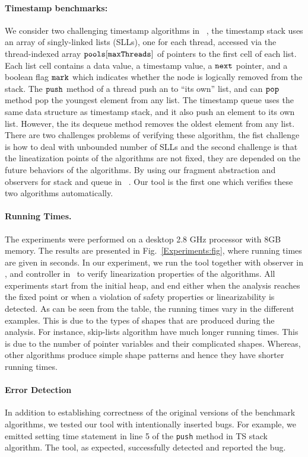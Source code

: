 \paragraph{Timestamp benchmarks:} We consider two challenging timestamp algorithms in ~\cite{ts-stack}, the timestamp stack uses an array of singly-linked lists (SLLs), one for each thread, accessed via the thread-indexed array ${\tt pools[maxThreads]}$ of pointers to the first cell of each list. Each list cell contains a data value, a timestamp value, a ${\tt next}$ pointer, and a boolean flag ${\tt mark}$ which indicates whether the node is logically removed from the stack. The $\tt push$ method of a thread push an to ``its own'' list, and can $\tt pop$ method pop the youngest element from any list. The timestamp queue uses the same data structure as timestamp stack, and it also push an element to its own list. However, the its dequeue method removes the oldest element from any list. There are two challenges problems of verifying these algorithm, the fist challenge is how to deal with unbounded number of SLLs and the second challenge is that the lineatization points of the algorithms are not fixed, they are depended on the future behaviors of the algorithms. By using our fragment abstraction and observers for stack and queue in ~\cite{BEEH:icalp15}. Our tool is the first one which verifies these two algorithms automatically.

\paragraph{Running Times.}The experiments were performed on a desktop 2.8 GHz processor with 8GB memory. The results are presented in Fig.~\ref{Experiments:fig}, where running times are given in seconds. In our experiment, we run the tool together with observer in \cite{AHHR:integrated:rep}, \cite{BEEH:icalp15} and controller in~\cite{Quy:sas16} to verify linearization properties of the algorithms. All experiments start from the initial heap,  
and end either when the analysis reaches the fixed point or when a violation of safety properties or linearizability is detected. As can be seen from the table, the running times vary in the different examples. This is due to the types of shapes that are produced during the analysis. For instance, skip-lists algorithm have much longer running times. This is due to the number of pointer variables and their complicated shapes. Whereas, other algorithms 
produce simple shape patterns and hence they have shorter running times.
\paragraph{Error Detection}
 In addition to establishing correctness of the original versions of the
benchmark algorithms, we tested our tool with intentionally inserted bugs. For example, we emitted setting time statement in line 5 of the {\tt push} method in TS stack algorithm. The tool, as expected, successfully detected and reported the bug.
 

